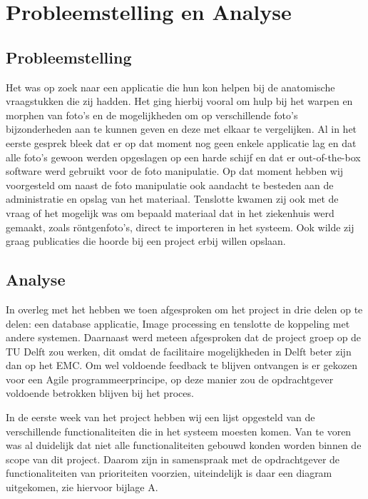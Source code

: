 \section{Probleemstelling en Analyse}
\label{Probleemstelling_en_analyse}
\subsection{Probleemstelling}
Het \casamproject was op zoek naar een applicatie die hun kon helpen bij de anatomische vraagstukken die zij hadden. 
Het ging hierbij vooral om hulp bij het warpen en morphen van foto's en de mogelijkheden om op verschillende foto's bijzonderheden aan te kunnen geven en deze met elkaar te vergelijken. 
Al in het eerste gesprek bleek dat er op dat moment nog geen enkele applicatie lag en dat alle foto's gewoon werden opgeslagen op een harde schijf en dat er out-of-the-box software werd gebruikt voor de foto manipulatie. 
Op dat moment hebben wij voorgesteld om naast de foto manipulatie ook aandacht te besteden aan de administratie en opslag van het materiaal.
Tenslotte kwamen zij ook met de vraag of het mogelijk was om bepaald materiaal dat in het ziekenhuis werd gemaakt, zoals r\"{o}ntgenfoto's, direct te importeren in het systeem. Ook wilde zij graag publicaties die hoorde bij een project erbij willen opslaan.

\subsection{Analyse}
In overleg met het \casamproject hebben we toen afgesproken om het project in drie delen op te delen: een database applicatie, Image processing en tenslotte de koppeling met andere systemen. 
Daarnaast werd meteen afgesproken dat de project groep op de TU Delft zou werken, dit omdat de facilitaire mogelijkheden in Delft beter zijn dan op het EMC. 
Om wel voldoende feedback te blijven ontvangen is er gekozen voor een Agile programmeerprincipe, op deze manier zou de opdrachtgever voldoende betrokken blijven bij het proces.

In de eerste week van het project hebben wij een lijst opgesteld van de verschillende functionaliteiten die in het systeem moesten komen. 
Van te voren was al duidelijk dat niet alle functionaliteiten gebouwd konden worden binnen de scope van dit project. 
Daarom zijn in samenspraak met de opdrachtgever de functionaliteiten van prioriteiten voorzien, uiteindelijk is daar een diagram uitgekomen, zie hiervoor bijlage A.

